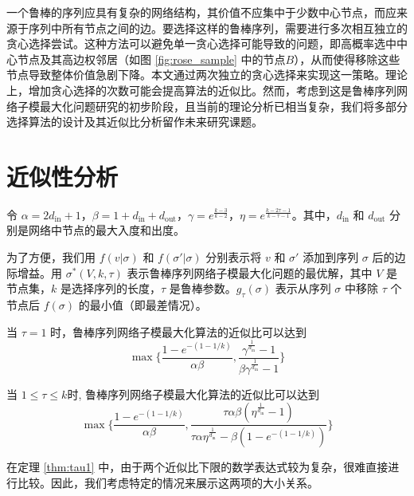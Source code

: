 一个鲁棒的序列应具有复杂的网络结构，其价值不应集中于少数中心节点，而应来源于序列中所有节点之间的边。要选择这样的鲁棒序列，需要进行多次相互独立的贪心选择尝试。这种方法可以避免单一贪心选择可能导致的问题，即高概率选中中心节点及其高边权邻居（如图 \ref{fig:rose_sample} 中的节点$B$），从而使得移除这些节点导致整体价值急剧下降。本文通过两次独立的贪心选择来实现这一策略。理论上，增加贪心选择的次数可能会提高算法的近似比。然而，考虑到这是鲁棒序列网络子模最大化问题研究的初步阶段，且当前的理论分析已相当复杂，我们将多部分选择算法的设计及其近似比分析留作未来研究课题。

\section{近似性分析}
\label{sec:3_3}

令 $\alpha=2 d_{\text{in}}+1$，$\beta=1+d_{\text{in}}+d_{\text{out}}$，$\gamma=e^{\frac{k-3}{k-2}}$，$\eta=e^{\frac{k-2\tau-1}{k-\tau-1}}$。其中，$d_{\text{in}}$ 和 $d_{\text{out}}$ 分别是网络中节点的最大入度和出度。

为了方便，我们用 $f(v|\sigma)$ 和 $f(\sigma'|\sigma)$ 分别表示将 $v$ 和 $\sigma'$ 添加到序列 $\sigma$ 后的边际增益。用 $\sigma^*(V,k,\tau)$ 表示鲁棒序列网络子模最大化问题的最优解，其中 $V$ 是节点集，$k$ 是选择序列的长度，$\tau$ 是鲁棒参数。$g_\tau(\sigma)$ 表示从序列 $\sigma$ 中移除 $\tau$ 个节点后 $f(\sigma)$ 的最小值（即最差情况）。

\begin{theorem}
\label{thm:tau1}
当 $\tau=1$ 时，鲁棒序列网络子模最大化算法的近似比可以达到
\begin{equation}
\max\{\frac{1-e^{-(1-1/k)}}{\alpha\beta},\frac{\gamma^{\frac{1}{d_{\text{in}}}}-1}{\beta \gamma^{\frac{1}{d_{\text{in}}}}-1}\}\end{equation}
\end{theorem}

\begin{theorem}
\label{thm:tau2}
当 $1\le \tau \le k$时, 鲁棒序列网络子模最大化算法的近似比可以达到
\begin{equation}
 \max\{\frac{1-e^{-(1-1/k)}}{\alpha\beta},\frac{\tau\alpha\beta(\eta^{\frac{1}{d_{\text{in}}}}-1)}{\tau\alpha\eta^{\frac{1}{d_{\text{in}}}}- \beta (1-e^{-(1-1/k)}) }\}    
\end{equation}
\end{theorem}

在定理 \ref{thm:tau1} 中，由于两个近似比下限的数学表达式较为复杂，很难直接进行比较。因此，我们考虑特定的情况来展示这两项的大小关系。

